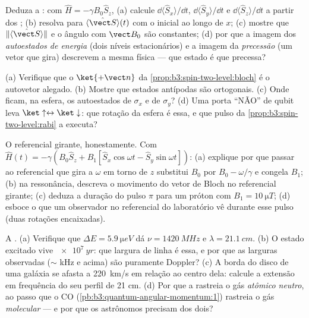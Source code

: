 \begin{exercise}[$\star\star$]\label{exo:b3:spin-two-level:5}
Deduza a : com $\hat H = -\gamma B_0\hat S_z$, (a)
calcule $\dd\langle\hat S_x\rangle/\dd t$, $\dd\langle\hat
S_y\rangle/\dd t$ e $\dd\langle\hat S_z\rangle/\dd t$ a partir dos
; (b) resolva para $\langle\hat{\vect S}\rangle(t)$ com o
 inicial ao longo de $x$; (c) mostre que
$\|\langle\hat{\vect S}\rangle\|$ e o ângulo com $\vect B_0$ são
constantes; (d) por que a imagem dos \emph{autoestados de energia}
(dois níveis estacionários) e a imagem da \emph{precessão} (um vetor
que gira) descrevem a mesma física --- que estado é que precessa?
\end{exercise}

\begin{exercise}[$\star\star$]\label{exo:b3:spin-two-level:6}
(a) Verifique que o $\ket{+\vect n}$ da
\cref{prop:b3:spin-two-level:bloch} é o autovetor alegado. (b) Mostre
que estados antípodas são ortogonais. (c) Onde ficam, na esfera, os
autoestados de $\sigma_x$ e de $\sigma_y$? (d) Uma porta ``NÃO'' de
qubit leva $\ket\uparrow \leftrightarrow \ket\downarrow$: que rotação
da esfera é essa, e que pulso da
\cref{prop:b3:spin-two-level:rabi} a executa?
\end{exercise}

\begin{exercise}[$\star\star$]\label{exo:b3:spin-two-level:7}
O referencial girante, honestamente. Com $\hat H(t) = -\gamma(B_0\hat S_z
+ B_1[\hat S_x\cos\omega t - \hat S_y\sin\omega t])$: (a) explique por
que passar ao referencial que gira a $\omega$ em torno de $z$ substitui
$B_0$ por $B_0 - \omega/\gamma$ e congela $B_1$; (b) na ressonância,
descreva o movimento do vetor de Bloch no referencial girante; (c)
deduza a duração do pulso $\pi$ para um próton com $B_1 =
\qty{10}{\micro T}$; (d) esboce o que um observador no referencial do
laboratório vê durante esse pulso (duas rotações encaixadas).
\end{exercise}

\begin{exercise}[$\star\star$]\label{exo:b3:spin-two-level:8}
A . (a) Verifique que $\Delta E = \qty{5.9}{\micro eV}$
dá $\nu = \qty{1420}{MHz}$ e $\lambda = \qty{21.1}{cm}$. (b)
O estado excitado vive $\qty{e7}{yr}$: que largura de linha é essa, e
por que as larguras observadas ($\sim$ kHz e acima) são puramente
Doppler? (c) A borda do disco de uma galáxia se afasta a
\qty{220}{km/s} em relação ao centro dela: calcule a extensão em
frequência do seu perfil de 21 cm. (d) Por que a 
rastreia o gás \emph{atômico neutro}, ao passo que o CO
(\cref{pb:b3:quantum-angular-momentum:1}) rastreia o gás
\emph{molecular} --- e por que os astrônomos precisam dos dois?
\end{exercise}

